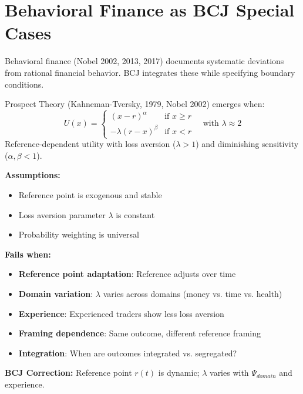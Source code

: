 
\section{Behavioral Finance as BCJ Special Cases}
\label{sec:behavioral-finance}

Behavioral finance (Nobel 2002, 2013, 2017) documents systematic deviations from rational financial behavior. BCJ integrates these while specifying boundary conditions.


\begin{theorem}
\label{thm:prospect-theory}
Prospect Theory (Kahneman-Tversky, 1979, Nobel 2002) emerges when:
\begin{equation}
\boxed{U(x) = \begin{cases} (x - r)^\alpha & \text{if } x \geq r \\ -\lambda(r - x)^\beta & \text{if } x < r \end{cases} \quad \text{with } \lambda \approx 2}
\end{equation}
Reference-dependent utility with loss aversion ($\lambda > 1$) and diminishing sensitivity ($\alpha, \beta < 1$).
\end{theorem}

\begin{tcolorbox}[colback=red!5!white, colframe=red!75!black, title=Boundary Condition: Where Prospect Theory Fails]
\textbf{Assumptions:}
\begin{itemize}[nosep]
\item Reference point is exogenous and stable
\item Loss aversion parameter $\lambda$ is constant
\item Probability weighting is universal
\end{itemize}

\textbf{Fails when:}
\begin{itemize}[nosep]
\item \textbf{Reference point adaptation}: Reference adjusts over time
\item \textbf{Domain variation}: $\lambda$ varies across domains (money vs. time vs. health)
\item \textbf{Experience}: Experienced traders show less loss aversion
\item \textbf{Framing dependence}: Same outcome, different reference framing
\item \textbf{Integration}: When are outcomes integrated vs. segregated?
\end{itemize}

\textbf{BCJ Correction:} Reference point $r(t)$ is dynamic; $\lambda$ varies with $\Psi_{domain}$ and experience.
\end{tcolorbox}

